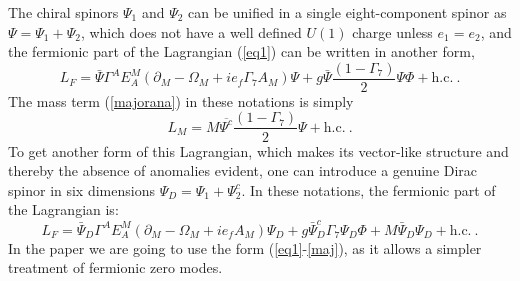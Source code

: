 \documentclass[a4paper,12pt]{article}
\begin{document}
The chiral spinors $\Psi_1$ and $\Psi_2$ can be unified in a single
eight-component spinor as $\Psi = \Psi_1+\Psi_2$, which does not have a
well defined $U(1)$ charge unless $e_1=e_2$,  and the fermionic part of
the Lagrangian (\ref{eq1}) can be written in another form,
\begin{equation}
L_F= \bar\Psi\Gamma^A E_A^M (\partial_M-\Omega_M+ i e_f\Gamma_7 A_M)\Psi+
g\bar\Psi\frac{(1-\Gamma_7)}{2}\Psi\Phi + \mbox{h.c.}~.
\end{equation}
The mass term (\ref{majorana}) in these notations is simply
\begin{equation}
L_M=M \overline{\Psi^c}\frac{(1-\Gamma_7)}{2}\Psi + \mbox{h.c.}~.
\label{maj}
\end{equation}
To get another form of this Lagrangian, which makes its
vector-like structure and thereby the absence of anomalies  evident,
one can introduce a genuine Dirac spinor in six dimensions $\Psi_D =
\Psi_1+\Psi_2^c$. In these notations, the fermionic part of the
Lagrangian is:
\begin{equation}
L_F= \bar\Psi_D\Gamma^A E_A^M (\partial_M-\Omega_M+ i e_f A_M)\Psi_D+
g\bar\Psi_D^c\Gamma_7\Psi_D\Phi + M\bar{\Psi}_D\Psi_D + \mbox{h.c.}~.
\end{equation}
In the paper we are going to use the form (\ref{eq1}-\ref{maj}), as it
allows a simpler treatment of fermionic zero modes.

\end{document}
